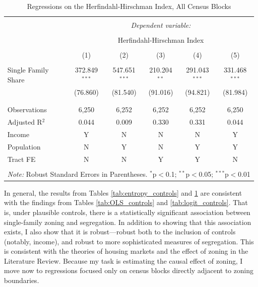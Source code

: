 \documentclass[11pt]{article}
\begin{document}
\begin{table}[!htbp] \centering 
  \caption{Regressions on the Herfindahl-Hirschman Index, All Census Blocks} 
  \label{tab:HHI_controls} 
\begin{tabular}{@{\extracolsep{5pt}}lccccc} 
\\[-1.8ex]\hline 
\hline \\[-1.8ex] 
 & \multicolumn{5}{c}{\textit{Dependent variable:}} \\ 
\cline{2-6} 
\\[-1.8ex] & \multicolumn{5}{c}{Herfindahl-Hirschman Index} \\ 
\\[-1.8ex] & (1) & (2) & (3) & (4) & (5)\\ 
\hline \\[-1.8ex] 
 Single Family Share & 372.849$^{***}$ & 547.651$^{***}$ & 210.204$^{**}$ & 291.043$^{***}$ & 331.468$^{***}$ \\ 
  & (76.860) & (81.540) & (91.016) & (94.821) & (81.984) \\ 
  & & & & & \\ 
\hline \\[-1.8ex] 
Observations & 6,250 & 6,252 & 6,252 & 6,252 & 6,250 \\ 
Adjusted R$^{2}$ & 0.044 & 0.009 & 0.330 & 0.331 & 0.044 \\ 
\hline 
Income & Y & N & N & N & Y\\
Population & N & Y & N & Y & Y\\
Tract FE & N & N & Y & Y & N\\
\hline 
\hline \\[-1.8ex] 
\multicolumn{6}{l}{\textit{Note:} Robust Standard Errors in Parentheses. $^{*}$p$<$0.1; $^{**}$p$<$0.05; $^{***}$p$<$0.01} \\ 
\end{tabular} 
\end{table}

In general, the results from Tables \ref{tab:entropy_controls} and \ref{tab:HHI_controls} are consistent with the findings from Tables \ref{tab:OLS_controls} and \ref{tab:logit_controls}. That is, under plausible controls, there is a statistically significant association between single-family zoning and segregation. In addition to showing that this association exists, I also show that it is robust---robust both to the inclusion of controls (notably, income), and robust to more sophisticated measures of segregation. This is consistent with the theories of housing markets and the effect of zoning in the Literature Review. Because my task is estimating the causal effect of zoning, I move now to regressions focused only on census blocks directly adjacent to zoning boundaries.
\end{document}
